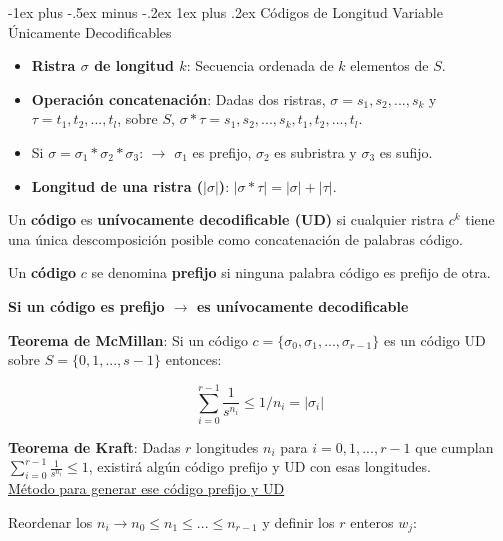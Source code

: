 \documentclass[10pt,landscape]{article}
\makeatletter
\renewcommand{\subsubsection}{\@startsection{subsubsection}{3}{0mm}%
                                {-1ex plus -.5ex minus -.2ex}%
                                {1ex plus .2ex}%
                                {\normalfont\small\bfseries}}
\makeatother
\begin{document}
\begin{multicols}{3}
\subsubsection{Códigos de Longitud Variable Únicamente Decodificables}

\begin{itemize}
	\item \textbf{Ristra $\sigma$ de longitud $k$}: Secuencia ordenada de $k$ elementos de $S$.
	\item \textbf{Operación concatenación}: Dadas dos ristras, $\sigma = s_1, s_2, ..., s_k$ y $\tau = t_1, t_2, ..., t_l$, sobre $S$, $\sigma * \tau = s_1, s_2, ..., s_k, t_1, t_2, ..., t_l$.
	\item Si $\sigma = \sigma_1 * \sigma_2 * \sigma_3$: $\rightarrow$ $\sigma_1$ es prefijo, $\sigma_2$ es subristra y $\sigma_3$ es sufijo.
	\item \textbf{Longitud de una ristra ($|\sigma|$)}: $|\sigma * \tau | = |\sigma| + |\tau|$.
\end{itemize}

Un \textbf{código} es \textbf{unívocamente decodificable (UD)} si cualquier ristra $c^k$ tiene una única descomposición posible como concatenación de palabras código.

Un \textbf{código} $c$ se denomina \textbf{prefijo} si ninguna palabra código es prefijo de otra.

\begin{center}
	\textbf{Si un código es prefijo $\rightarrow$ es unívocamente decodificable}
\end{center}

\textbf{Teorema de McMillan}: Si un código $c = \{ \sigma_0, \sigma_1, ..., \sigma_{r-1} \}$ es un código UD sobre $S = \{ 0, 1, ..., s-1 \}$ entonces:

	\begin{equation*}
		\sum_{i = 0}^{r-1} \frac{1}{s^{n_i}} \leq 1 / n_i = |\sigma_i|
	\end{equation*}
	
\textbf{Teorema de Kraft}: Dadas $r$ longitudes $n_i$ para $i = 0, 1, ..., r-1$ que cumplan $\sum_{i = 0}^{r-1} \frac{1}{s^{n_i}} \leq 1$, existirá algún código prefijo y UD con esas longitudes. \\

\underline{Método para generar ese código prefijo y UD}

Reordenar los $n_i \rightarrow n_0 \leq n_1 \leq ... \leq n_{r-1}$ y definir los $r$ enteros $w_j$:


\end{multicols}
\end{document}
